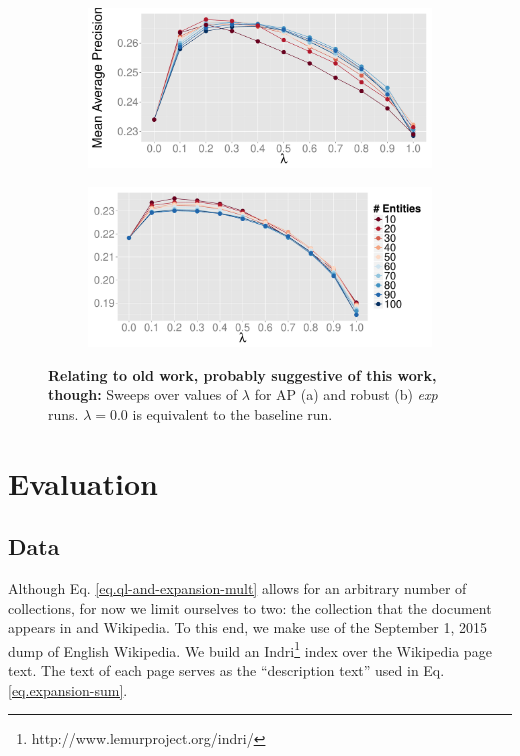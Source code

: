 \documentclass{report}
\begin{document}
\begin{figure}[!htb]
\centering
\begin{subfigure}{.5\columnwidth}
\centering
\includegraphics[width=\columnwidth]{figures/sweep-entities-AP.pdf}
\end{subfigure}%
\begin{subfigure}{.5\columnwidth}
\centering
\includegraphics[width=\columnwidth]{figures/sweep-entities-robust.pdf}
\end{subfigure}
\caption{\textbf{Relating to old work, probably suggestive of this work, though:} Sweeps over values of $\lambda$ for AP (a) and robust (b) \textit{exp} runs. $\lambda=0.0$ is equivalent to the baseline run.}
\label{figure.sweeps-ql}
\end{figure}

\section{Evaluation}\label{section.evaluation}

\subsection{Data}\label{section.evaluation.collections}

Although Eq. \ref{eq.ql-and-expansion-mult} allows for an arbitrary number of collections, for now we limit ourselves to two: the collection that the document appears in and Wikipedia. To this end, we make use of the September 1, 2015 dump of English Wikipedia. We build an Indri\footnote{http://www.lemurproject.org/indri/} index over the Wikipedia page text. The text of each page serves as the ``description text'' used in Eq. \ref{eq.expansion-sum}.
\end{document}
